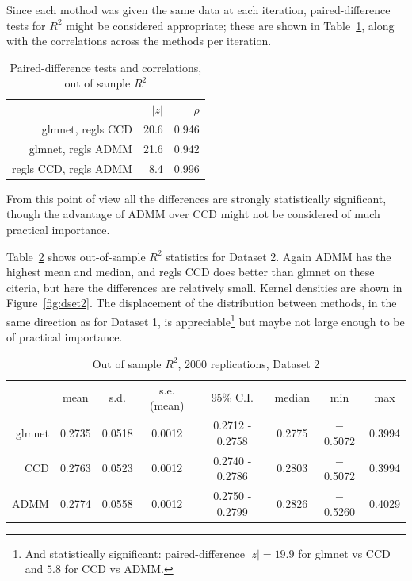 \documentclass{article}
\begin{document}
Since each mothod was given the same data at each iteration,
paired-difference tests for $R^2$ might be considered appropriate;
these are shown in Table~\ref{tab:paired}, along with the correlations
across the methods per iteration.

\begin{table}[htbp]
\begin{center}
  \begin{tabular}{rrr}
    & $|z|$ & $\rho$ \\[4pt]
glmnet, regls CCD & 20.6 & 0.946 \\
glmnet, regls ADMM & 21.6 & 0.942 \\
regls CCD, regls ADMM & 8.4 & 0.996 \\
  \end{tabular}
  \caption{Paired-difference tests and correlations, out of sample $R^2$}
  \label{tab:paired}  
\end{center}
\end{table}

From this point of view all the differences are strongly statistically
significant, though the advantage of ADMM over CCD might not be
considered of much practical importance.


Table~\ref{tab:dset2} shows out-of-sample $R^2$ statistics for Dataset
2. Again ADMM has the highest mean and median, and regls CCD does
better than glmnet on these citeria, but here the differences are
relatively small. Kernel densities are shown in
Figure~\ref{fig:dset2}. The displacement of the distribution between
methods, in the same direction as for Dataset 1, is
appreciable\footnote{And statistically significant: paired-difference
  $|z| = 19.9$ for glmnet vs CCD and $5.8$ for CCD vs ADMM.} but
maybe not large enough to be of practical importance.

\begin{table}[htbp]
  \centering
  \begin{tabular}{rccccccc}
 & mean & s.d. & s.e.(mean) & 95\% C.I. & median & min & max \\
      glmnet & 0.2735 & 0.0518 & 0.0012 & 0.2712 - 0.2758 & 0.2775 & $-$0.5072 & 0.3994 \\
         CCD & 0.2763 & 0.0523 & 0.0012 & 0.2740 - 0.2786 & 0.2803 & $-$0.5072 & 0.3994 \\
        ADMM & 0.2774 & 0.0558 & 0.0012 & 0.2750 - 0.2799 & 0.2826 & $-$0.5260 & 0.4029 \\
  \end{tabular}
  \caption{Out of sample $R^2$, 2000 replications, Dataset 2}
  \label{tab:dset2}
\end{table}
\end{document}
